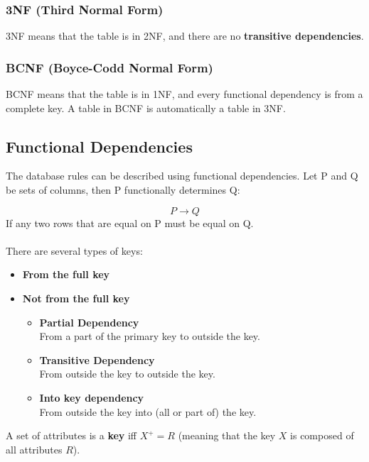 \documentclass{article}
\begin{document}
\subsubsection{3NF (Third Normal Form)}
3NF means that the table is in 2NF, and there are no \textbf{transitive dependencies}.

\subsubsection{BCNF (Boyce-Codd Normal Form)}
BCNF means that the table is in 1NF, and every functional dependency is from a complete key. A table in BCNF is automatically a table in 3NF.

\subsection{Functional Dependencies}
The database rules can be described using functional dependencies. Let P and Q be sets of columns, then P functionally determines Q:

\[ P \rightarrow Q \]
If any two rows that are equal on P must be equal on Q. \\ \\
There are several types of keys:

\begin{itemize}
	\item \textbf{From the full key}
	
	\item \textbf{Not from the full key}
	\begin{itemize}
		\item \textbf{Partial Dependency}
		\vspace{.2cm} \\
		From a part of the primary key to outside the key.
		
		\item \textbf{Transitive Dependency}
		\vspace{.2cm} \\
		From outside the key to outside the key.
		
		\item \textbf{Into key dependency}
		\vspace{.2cm} \\
		From outside the key into (all or part of) the key.
	\end{itemize}
\end{itemize}
A set of attributes is a \textbf{key} iff $X^+ = R$ (meaning that the key $X$ is composed of all attributes $R$).
\end{document}
